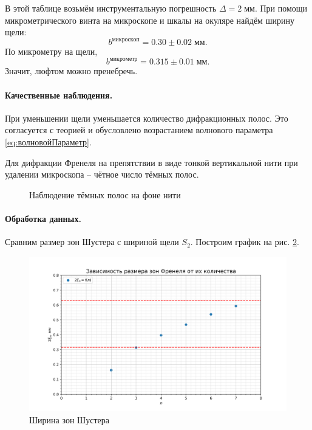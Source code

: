 \documentclass[a4paper, 12pt]{article}
\begin{document}
В этой таблице возьмём инструментальную погрешность $ \Delta = 2 \; мм $.
При помощи микрометрического винта на микроскопе и шкалы на окуляре найдём ширину щели:
\begin{equation*}\label{key}
	b^{микроскоп} = 0.30\pm 0.02 \; мм.
\end{equation*}
По микрометру на щели,
\begin{equation*}\label{key}
	b^{микрометр} = 0.315\pm 0.01 \; мм.
\end{equation*}
Значит, люфтом можно пренебречь.

\paragraph{Качественные наблюдения.}

При уменьшении щели уменьшается количество дифракционных полос. Это согласуется с теорией и обусловлено возрастанием волнового параметра \eqref{eq:волновойПараметр}.

Для дифракции Френеля на препятствии в виде тонкой вертикальной нити при удалении микроскопа -- чётное число тёмных полос.

\begin{figure}[h]
		\begin{minipage}[h]{0.4\linewidth}
		\end{minipage}
		\hfill
		\begin{minipage}[h]{0.4\linewidth}
		\end{minipage}
		\hfill
		\caption{Наблюдение тёмных полос на фоне нити}
		\label{fig:yarn}
	\end{figure}

\paragraph{Обработка данных.}

Сравним размер зон Шустера с шириной щели $ S_2 $. Построим график на рис. \ref{fig:ФренельГрафик}.
\begin{figure}[h!]
	\centering
	\includegraphics[scale=0.7]{4.3.1_1.png}
	\caption{Ширина зон Шустера}
	\label{fig:ФренельГрафик}
\end{figure}
\end{document}
